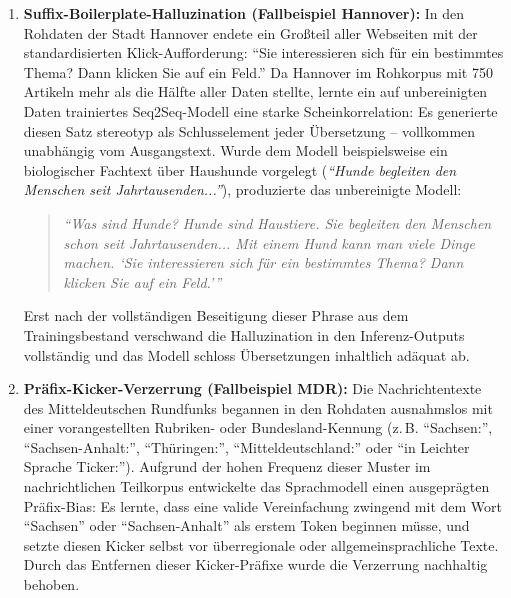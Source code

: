 \begin{enumerate}
    \item \textbf{Suffix-Boilerplate-Halluzination (Fallbeispiel Hannover):} In den Rohdaten der Stadt Hannover endete ein Großteil aller Webseiten mit der standardisierten Klick-Aufforderung: \enquote{Sie interessieren sich für ein bestimmtes Thema? Dann klicken Sie auf ein Feld.} Da Hannover im Rohkorpus mit 750 Artikeln mehr als die Hälfte aller Daten stellte, lernte ein auf unbereinigten Daten trainiertes Seq2Seq-Modell eine starke Scheinkorrelation: Es generierte diesen Satz stereotyp als Schlusselement jeder Übersetzung – vollkommen unabhängig vom Ausgangstext. Wurde dem Modell beispielsweise ein biologischer Fachtext über Haushunde vorgelegt (\textit{\enquote{Hunde begleiten den Menschen seit Jahrtausenden...}}), produzierte das unbereinigte Modell:
    \begin{quote}
        \small
        \textit{\enquote{Was sind Hunde? Hunde sind Haustiere. Sie begleiten den Menschen schon seit Jahrtausenden... Mit einem Hund kann man viele Dinge machen. \enquote{Sie interessieren sich für ein bestimmtes Thema? Dann klicken Sie auf ein Feld.}}}
    \end{quote}
    Erst nach der vollständigen Beseitigung dieser Phrase aus dem Trainingsbestand verschwand die Halluzination in den Inferenz-Outputs vollständig und das Modell schloss Übersetzungen inhaltlich adäquat ab.
    
    \item \textbf{Präfix-Kicker-Verzerrung (Fallbeispiel MDR):} Die Nachrichtentexte des Mitteldeutschen Rundfunks begannen in den Rohdaten ausnahmslos mit einer vorangestellten Rubriken- oder Bundesland-Kennung (z.\,B. \enquote{Sachsen:}, \enquote{Sachsen-Anhalt:}, \enquote{Thüringen:}, \enquote{Mitteldeutschland:} oder \enquote{in Leichter Sprache Ticker:}). Aufgrund der hohen Frequenz dieser Muster im nachrichtlichen Teilkorpus entwickelte das Sprachmodell einen ausgeprägten Präfix-Bias: Es lernte, dass eine valide Vereinfachung zwingend mit dem Wort \enquote{Sachsen} oder \enquote{Sachsen-Anhalt} als erstem Token beginnen müsse, und setzte diesen Kicker selbst vor überregionale oder allgemeinsprachliche Texte. Durch das Entfernen dieser Kicker-Präfixe wurde die Verzerrung nachhaltig behoben.


\end{enumerate}
